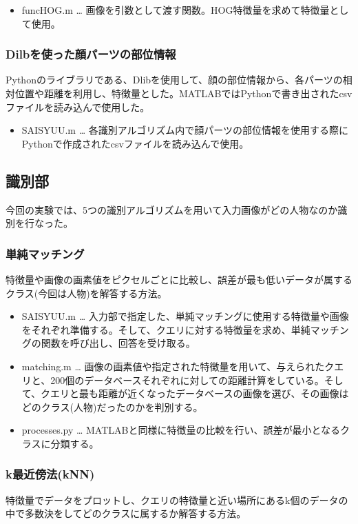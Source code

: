 \documentclass[10.5pt,a4j]{jarticle}
\begin{document}
	\begin{itemize}
		\item funcHOG.m … 画像を引数として渡す関数。HOG特徴量を求めて特徴量として使用。
	\end{itemize}
	\subsubsection{Dilbを使った顔パーツの部位情報}
	Pythonのライブラリである、Dlibを使用して、顔の部位情報から、各パーツの相対位置や距離を利用し、特徴量とした。MATLABではPythonで書き出されたcsvファイルを読み込んで使用した。

	\begin{itemize}
		\item SAISYUU.m … 各識別アルゴリズム内で顔パーツの部位情報を使用する際にPythonで作成されたcsvファイルを読み込んで使用。
	\end{itemize}
	\subsection{識別部}
	今回の実験では、5つの識別アルゴリズムを用いて入力画像がどの人物なのか識別を行なった。
	\subsubsection{単純マッチング}
	特徴量や画像の画素値をピクセルごとに比較し、誤差が最も低いデータが属するクラス(今回は人物)を解答する方法。

	\begin{itemize}
		\item SAISYUU.m … 入力部で指定した、単純マッチングに使用する特徴量や画像をそれぞれ準備する。そして、クエリに対する特徴量を求め、単純マッチングの関数を呼び出し、回答を受け取る。
		\item matching.m … 画像の画素値や指定された特徴量を用いて、与えられたクエリと、200個のデータベースそれぞれに対しての距離計算をしている。そして、クエリと最も距離が近くなったデータベースの画像を選び、その画像はどのクラス(人物)だったのかを判別する。
		\item processes.py … MATLABと同様に特徴量の比較を行い、誤差が最小となるクラスに分類する。
	\end{itemize}
	\subsubsection{k最近傍法(kNN)}
	特徴量でデータをプロットし、クエリの特徴量と近い場所にあるk個のデータの中で多数決をしてどのクラスに属するか解答する方法。
\end{document}
